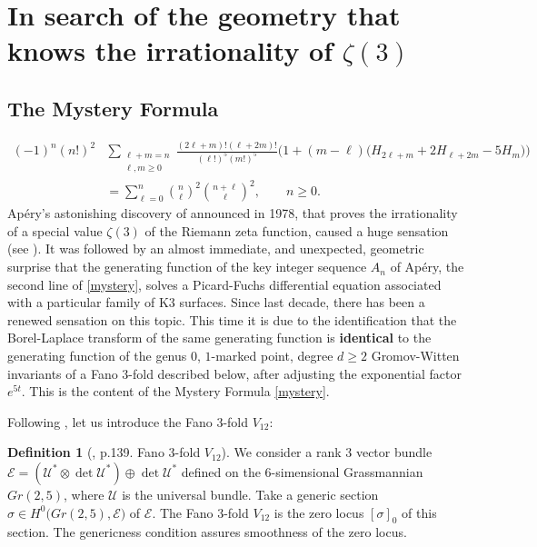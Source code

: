 \documentclass{amsart}
\theoremstyle{definition}
\newtheorem{Def}[thm]{Definition}
\numberwithin{equation}{section}
\numberwithin{figure}{section}
\def\tensor{\otimes}
\def\dsum{\oplus}
\def\sig{\sigma}
\newcommand{\be}{\begin{equation}}
\newcommand{\ee}{\end{equation}}
\newcommand{\cE}{{\mathcal{E}}}
\newcommand{\cU}{{\mathcal{U}}}
\begin{document}
\section{In search of the geometry that knows the irrationality of 
$\zeta(3)$}
\label{zeta3}


\subsection{The Mystery Formula} 
\be
\begin{aligned}
\label{mystery}
(-1)^n (n!)^2 &\sum_{\substack{\ell+m=n\\
\ell,m\ge 0}}
\frac{(2\ell+m)! (\ell+2m)!}
{(\ell !)^5  (m!)^5}\bigg(1+(m-\ell)\big(H_{2\ell+m} 
+2H_{\ell + 2m} -5 H_m\big)\bigg)
\\
&=\sum_{\ell=0}^n\binom{n}{\ell}^2 \binom{n+\ell}{\ell}^2, \qquad 
n\ge 0.
\end{aligned}
\ee
Ap\'ery's astonishing discovery of \cite{A} announced in 1978, 
that proves
the irrationality of a special value $\zeta(3)$ of the Riemann zeta function, 
caused a huge sensation (see \cite{vdP}). It was followed by an almost
immediate, and unexpected, geometric surprise \cite{B, BP} that 
the generating function of the key integer sequence $A_n$  of 
Ap\'ery,
the second line of \eqref{mystery}, solves a 
Picard-Fuchs  differential equation 
associated with a particular family of K3 surfaces. 
Since last decade, there has been a renewed sensation
\cite{Gal, GKS, GZ, MS2024, Zagier} on this topic.
This time it is due to the identification that the  Borel-Laplace transform of the
same generating function   is  \textbf{identical} to the 
generating function of the 
genus $0$,  $1$-marked point, degree $d\ge 2$
Gromov-Witten invariants of  a 
Fano $3$-fold described below, after adjusting the exponential factor 
$e^{5t}$.
  This is the content of  the Mystery Formula \eqref{mystery}.

Following
\cite{CCGK}, let us introduce the 
Fano $3$-fold $V_{12}$:



\begin{Def}[\cite{CCGK}, p.139. Fano $3$-fold $V_{12}$]   
We consider a rank $3$ vector bundle 
$\cE=(\cU^*\tensor \det \cU^*)\dsum \det \cU^*$ defined on the
$6$-simensional
Grassmannian $Gr(2,5)$, where $\cU$ is the universal bundle.
Take  a generic section
$
\sigma
\in H^0\big(Gr(2,5), \cE)
$
of  $\cE$.  The Fano $3$-fold $V_{12}$ is the zero locus $[\sig]_0$ of this
section. The genericness condition assures  smoothness of the zero locus. 
\end{Def}
\end{document}
